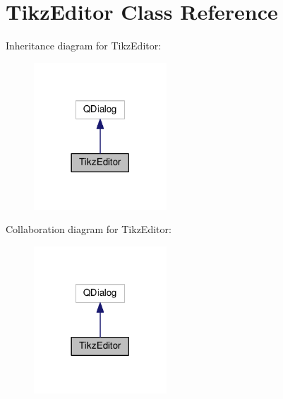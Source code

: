 \hypertarget{classTikzEditor}{\section{Tikz\+Editor Class Reference}
\label{classTikzEditor}
}


Inheritance diagram for Tikz\+Editor\+:\nopagebreak
\begin{figure}[H]
\begin{center}
\leavevmode
\includegraphics[width=141pt]{classTikzEditor__inherit__graph}
\end{center}
\end{figure}


Collaboration diagram for Tikz\+Editor\+:\nopagebreak
\begin{figure}[H]
\begin{center}
\leavevmode
\includegraphics[width=141pt]{classTikzEditor__coll__graph}
\end{center}
\end{figure}
